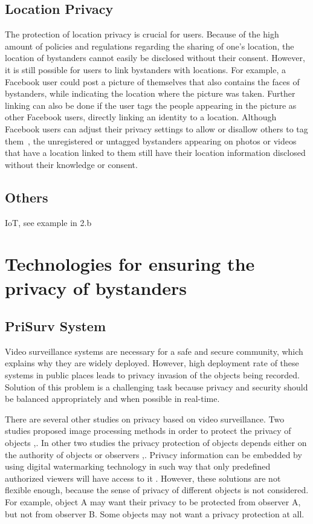 \documentclass[conference]{IEEEtran}
\begin{document}
\subsection{Location Privacy}\label{Location}
The protection of location privacy is crucial for users. Because of the high amount of policies and regulations regarding the sharing of one's location, the location of bystanders cannot easily be disclosed without their consent. However, it is still possible for users to link bystanders with locations. For example, a Facebook user could post a picture of themselves that also contains the faces of bystanders, while indicating the location where the picture was taken. Further linking can also be done if the user tags the people appearing in the picture as other Facebook users, directly linking an identity to a location. Although Facebook users can adjust their privacy settings to allow or disallow others to tag them~\cite{facebook2020help}, the unregistered or untagged bystanders appearing on photos or videos that have a location linked to them still have their location information disclosed without their knowledge or consent.

\subsection{Others}\label{Others}
IoT, see example in 2.b

\section{Technologies for ensuring the privacy of bystanders}\label{Technologies}

\subsection{PriSurv System}
Video surveillance systems are necessary for a safe and secure community, which explains why they are widely deployed. However, high deployment rate of these systems in public places leads to privacy invasion of the objects being recorded. Solution of this problem is a challenging task because privacy and security should be balanced appropriately and when possible in real-time.

There are several other studies on privacy based on video surveillance. Two studies proposed image processing methods in order to protect the privacy of objects \cite{cavallaro2005},\cite{kitahara2004}. In other two studies the privacy protection of objects depends either on the authority of objects or observers \cite{jehan2005},\cite{senior2005}. Privacy information can be embedded by using digital watermarking technology in such way that only predefined authorized viewers will have access to it \cite{zhang2005}. However, these solutions are not flexible enough, because the sense of privacy of different objects is not considered. For example, object A may want their privacy to be protected from observer A, but not from observer B. Some objects may not want a privacy protection at all. 
\end{document}
